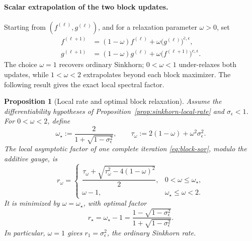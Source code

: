 \documentclass[11pt]{article}
\newtheorem{proposition}{Proposition}[section]
\theoremstyle{definition}
\theoremstyle{remark}
\newcommand{\eps}{\epsilon}
\begin{document}
\paragraph{Scalar extrapolation of the two block updates.}
Starting from $(f^{(\ell)},g^{(\ell)})$, and for a relaxation parameter
$\omega>0$, set
\begin{equation}
  \label{eq:block-sor}
  \begin{aligned}
    f^{(\ell+1)}
    &=
    (1-\omega)f^{(\ell)}
    +\omega\bigl(g^{(\ell)}\bigr)^{\bar c,\eps},
    \\
    g^{(\ell+1)}
    &=
    (1-\omega)g^{(\ell)}
    +\omega\bigl(f^{(\ell+1)}\bigr)^{c,\eps}.
  \end{aligned}
\end{equation}
The choice $\omega=1$ recovers ordinary Sinkhorn; $0<\omega<1$
under-relaxes both updates, while $1<\omega<2$ extrapolates beyond each
block maximizer. The following result gives the exact local spectral
factor.

\begin{proposition}[Local rate and optimal block relaxation]
  \label{prop:optimal-overrelaxation}
  Assume the differentiability hypotheses of
  Proposition~\ref{prop:sinkhorn-local-rate} and $\sigma_\eps<1$.
  For $0<\omega<2$, define
  \begin{equation}
    \label{eq:sor-threshold}
    \omega_\star
    :=
    \frac{2}{1+\sqrt{1-\sigma_\eps^2}},
    \qquad
    \tau_\omega
    :=
    2(1-\omega)+\omega^2\sigma_\eps^2.
  \end{equation}
  The local asymptotic factor of one complete iteration
  \eqref{eq:block-sor}, modulo the additive gauge, is
  \begin{equation}
    \label{eq:sor-rate}
    r_\omega
    =
    \begin{cases}
      \dfrac{\tau_\omega+
      \sqrt{\tau_\omega^2-4(1-\omega)^2}}{2},
      & 0<\omega\leq\omega_\star,
      \\[3mm]
      \omega-1,
      & \omega_\star\leq\omega<2.
    \end{cases}
  \end{equation}
  It is minimized by $\omega=\omega_\star$, with optimal factor
  \begin{equation}
    \label{eq:optimal-sor-rate}
    r_\star
    =
    \omega_\star-1
    =
    \frac{1-\sqrt{1-\sigma_\eps^2}}
         {1+\sqrt{1-\sigma_\eps^2}}.
  \end{equation}
  In particular, $\omega=1$ gives $r_1=\sigma_\eps^2$, the ordinary
  Sinkhorn rate.
\end{proposition}
\end{document}
